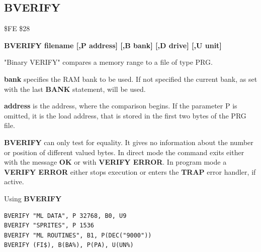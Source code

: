 
\newpage
\subsection{BVERIFY}
\begin{description}[leftmargin=2cm,style=nextline]
\item [Token:] \$FE \$28
\item [Format:] {\bf BVERIFY filename [,P address]
                [,B bank] [,D drive] [,U unit] }
\item [Usage:]
   "Binary VERIFY" compares a memory range to
   a file of type PRG.

   \filenamedefinition

   {\bf bank} specifies the RAM bank to be used.
   If not specified the current bank, as set with the last
   {\bf BANK} statement, will be used.

   {\bf address} is the address, where the comparison begins.
   If the parameter P is omitted, it is the load address,
   that is stored in the first two bytes of the PRG file.

   \drivedefinition

   \unitdefinition

\item [Remarks:]
   {\bf BVERIFY} can only test for equality. It gives no information
   about the number or position of different valued bytes.
   In direct mode the command exits either with the message {\bf OK}
   or with {\bf VERIFY ERROR}. In program mode a {\bf VERIFY ERROR}
   either stops execution or enters the {\bf TRAP} error handler,
   if active.

\item [Example:] Using {\bf BVERIFY}
\begin{tcolorbox}[colback=black,coltext=white]
\verbatimfont{\codefont}
\begin{verbatim}
BVERIFY "ML DATA", P 32768, B0, U9
BVERIFY "SPRITES", P 1536
BVERIFY "ML ROUTINES", B1, P(DEC("9000"))
BVERIFY (FI$), B(BA%), P(PA), U(UN%)
\end{verbatim}
\end{tcolorbox}
\end{description}


\newpage
